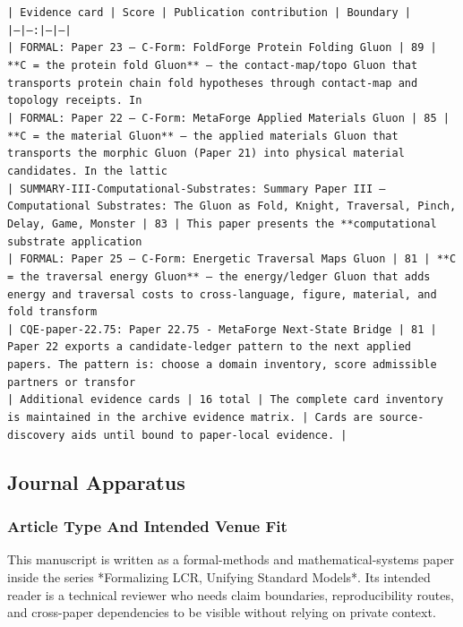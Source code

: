 \documentclass[11pt]{article}
\begin{document}
\noindent\texttt{| Evidence card | Score | Publication contribution | Boundary |}\\
\noindent\texttt{|---|---:|---|---|}\\
\noindent\texttt{| FORMAL: Paper 23 — C-Form: FoldForge Protein Folding Gluon | 89 | **C = the protein fold Gluon** — the contact-map/topo Gluon that transports protein chain fold hypotheses through contact-map and topology receipts. In }\\
\noindent\texttt{| FORMAL: Paper 22 — C-Form: MetaForge Applied Materials Gluon | 85 | **C = the material Gluon** — the applied materials Gluon that transports the morphic Gluon (Paper 21) into physical material candidates. In the lattic}\\
\noindent\texttt{| SUMMARY-III-Computational-Substrates: Summary Paper III — Computational Substrates: The Gluon as Fold, Knight, Traversal, Pinch, Delay, Game, Monster | 83 | This paper presents the **computational substrate application}\\
\noindent\texttt{| FORMAL: Paper 25 — C-Form: Energetic Traversal Maps Gluon | 81 | **C = the traversal energy Gluon** — the energy/ledger Gluon that adds energy and traversal costs to cross-language, figure, material, and fold transform}\\
\noindent\texttt{| CQE-paper-22.75: Paper 22.75 - MetaForge Next-State Bridge | 81 | Paper 22 exports a candidate-ledger pattern to the next applied papers. The pattern is: choose a domain inventory, score admissible partners or transfor}\\
\noindent\texttt{| Additional evidence cards | 16 total | The complete card inventory is maintained in the archive evidence matrix. | Cards are source-discovery aids until bound to paper-local evidence. |}\\

\subsection*{Journal Apparatus}

\subsubsection*{Article Type And Intended Venue Fit}

This manuscript is written as a formal-methods and mathematical-systems paper
inside the series *Formalizing LCR, Unifying Standard Models*. Its intended
reader is a technical reviewer who needs claim boundaries, reproducibility
routes, and cross-paper dependencies to be visible without relying on private
context.
\end{document}
